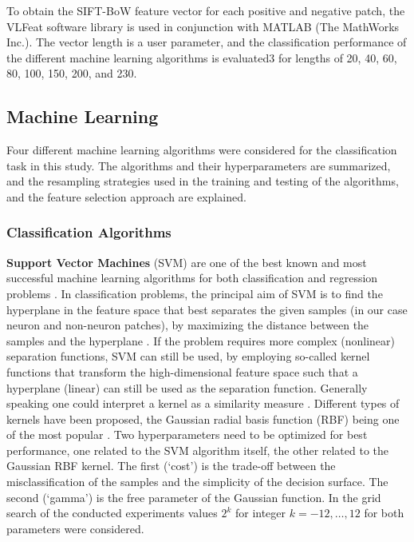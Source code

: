 To obtain the SIFT-BoW feature vector for each positive and negative patch, the VLFeat software library \cite{vedaldi2010vlfeat} is used in conjunction with MATLAB (The MathWorks Inc.). The vector length is a user parameter, and the classification performance of the different machine learning algorithms is evaluated3 for lengths of 20, 40, 60, 80, 100, 150, 200, and 230.

\subsection{Machine Learning}
\label{subsec:machineLearning}
Four different machine learning algorithms were considered for the classification task in this study. The algorithms and their hyperparameters are summarized, and the resampling strategies used in the training and testing of the algorithms, and the feature selection approach are explained.

\subsubsection{Classification Algorithms}
\label{subsubsec:classifiers}
{\bf Support Vector Machines} (SVM) are one of the best known and most successful machine learning algorithms for both classification and regression problems \cite{boser1992training, vapnik1998statistical, vapnik2013nature, bishop2006pattern}. In classification problems, the principal aim of SVM is to find the hyperplane in the feature space that best separates the given samples (in our case neuron and non-neuron patches), by maximizing the distance between the samples and the hyperplane \cite{burges1998tutorial}. If the problem requires more complex (nonlinear) separation functions, SVM can still be used, by employing so-called kernel functions that transform the high-dimensional feature space such that a hyperplane (linear) can still be used as the separation function. Generally speaking one could interpret a kernel as a similarity measure \cite{vert2004primer}. Different types of kernels have been proposed, the Gaussian radial basis function (RBF) being one of the most popular \cite{cristianini2000introduction}. Two hyperparameters need to be optimized for best performance, one related to the SVM algorithm itself, the other related to the Gaussian RBF kernel. The first (`cost') is the trade-off between the misclassification of the samples and the simplicity of the decision surface. The second (`gamma') is the free parameter of the Gaussian function. In the grid search of the conducted experiments values $2^k$ for integer $k=-12,\dots,12$ for both parameters were considered.

